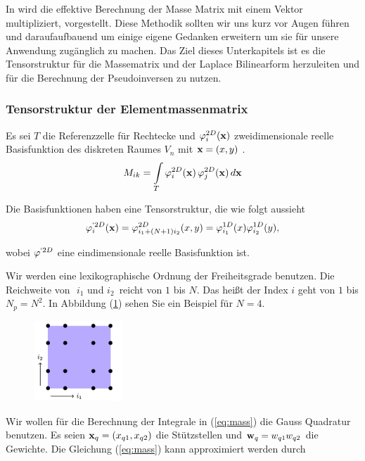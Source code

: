 In \cite{Teachlet} wird die effektive Berechnung der Masse Matrix mit einem Vektor multipliziert, vorgestellt. Diese Methodik sollten wir uns kurz vor Augen führen und daraufaufbauend um einige eigene Gedanken erweitern um sie für unsere Anwendung zugänglich zu machen.
Das Ziel dieses Unterkapitels ist es die Tensorstruktur für die Massematrix und der Laplace Bilinearform herzuleiten und für die Berechnung der Pseudoinversen zu nutzen. 

\subsubsection{Tensorstruktur der Elementmassenmatrix}
Es sei $T$ die Referenzzelle für Rechtecke und $\varphi^{2D}_i(\bold{x})$ zweidimensionale reelle Basisfunktion des diskreten Raumes $V_n$ mit $\bold{x}=(x,y)$ .
\begin{equation} \label{eq:mass}
M_{ik} = \int\limits_{T} \varphi^{2D}_i (\bold{x}) \, \varphi^{2D}_j (\bold{x}) \, d\bold{x}
\end{equation}

Die Basisfunktionen haben eine Tensorstruktur, die wie folgt aussieht
\begin{equation} \label{eq:tensor}
\varphi^{`2D}_i(\bold{x})=\varphi^{2D}_{i_1+(N+1)i_2}(x,y)=\varphi^{1D}_{i_1}(x)\varphi^{1D}_{i_2}(y),
\end{equation}

wobei $\varphi^{`2D}$ eine eindimensionale reelle Basisfunktion ist.

Wir werden eine lexikographische Ordnung der Freiheitsgrade benutzen. Die Reichweite von $\, \, i_1 $ und $ i_2 \, $ reicht von $1$ bis $N$. Das heißt der Index $i$ geht von $1$ bis $N_p=N^2$. In Abbildung (\ref{fig:lexi}) sehen Sie ein Beispiel für $N=4$.

\begin{figure}[ht] 
	\centering
  \includegraphics[width=0.3\textwidth]{lexi.png}
	\caption{ \cite[3]{Teachlet}}
	\label{fig:lexi}
\end{figure}

Wir wollen für die Berechnung der Integrale in (\ref{eq:mass}) die Gauss Quadratur benutzen.
Es seien $\bold{x}_q=(x_{q1},x_{q2})$ die Stützstellen und $\bold{w}_q=w_{q1}w_{q2}$ die Gewichte. Die Gleichung (\ref{eq:mass}) kann approximiert werden durch

